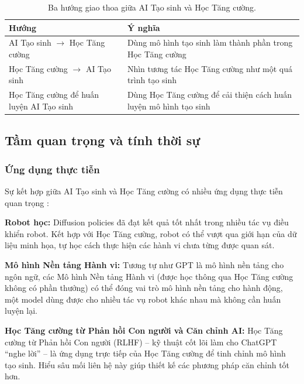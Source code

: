 \begin{table}[H]
    \centering
    \caption{Ba hướng giao thoa giữa AI Tạo sinh và Học Tăng cường.}
    \label{tab:convergence}
    \small
    \begin{tabular}{p{} p{}}
        \toprule
        \textbf{Hướng} & \textbf{Ý nghĩa} \\
        \midrule
        AI Tạo sinh $\to$ Học Tăng cường & Dùng mô hình tạo sinh làm thành phần trong Học Tăng cường \\
        Học Tăng cường $\to$ AI Tạo sinh & Nhìn tương tác Học Tăng cường như một quá trình tạo sinh \\
        Học Tăng cường để huấn luyện AI Tạo sinh & Dùng Học Tăng cường để cải thiện cách huấn luyện mô hình tạo sinh \\
        \bottomrule
    \end{tabular}
    \normalsize
\end{table}
 
\subsection{Tầm quan trọng và tính thời sự}
 
\subsubsection{Ứng dụng thực tiễn}
 
Sự kết hợp giữa AI Tạo sinh và Học Tăng cường có nhiều ứng dụng thực tiễn quan
trọng \cite{chi2023diffusion} \cite{ouyang2022instructgpt}:
 
\textbf{Robot học:} Diffusion policies đã đạt kết quả tốt nhất trong
nhiều tác vụ điều khiển robot. Kết hợp với Học Tăng cường, robot có thể vượt qua
giới hạn của dữ liệu minh họa, tự học cách thực hiện các hành vi
chưa từng được quan sát.
 
\textbf{Mô hình Nền tảng Hành vi:} Tương tự như GPT là mô hình nền tảng cho ngôn ngữ, các Mô hình Nền tảng Hành vi (được học thông qua Học Tăng cường không có phần thưởng) có thể đóng vai trò mô hình nền tảng cho hành động, một model dùng được cho nhiều tác vụ robot khác nhau mà không cần huấn luyện lại.
 
\textbf{Học Tăng cường từ Phản hồi Con người và Căn chỉnh AI:} Học Tăng cường từ Phản hồi Con người
(RLHF) -- kỹ thuật cốt lõi làm cho ChatGPT ``nghe lời'' --
là ứng dụng trực tiếp của Học Tăng cường để tinh chỉnh mô hình tạo sinh. Hiểu
sâu mối liên hệ này giúp thiết kế các phương pháp căn chỉnh tốt hơn.
 

